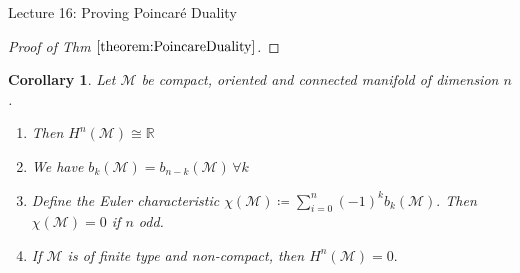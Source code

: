 \documentclass[10pt]{article}
\theoremstyle{plain}
\newtheorem{corollary}[thm]{Corollary}
\theoremstyle{definition}
\newcommand{\Real}{\mathbb{R}}
\newcommand{\man}{\mathcal{M}}
\newcommand{\sumfromto}[2]{\sum\limits_{#1}^{#2}}
\newcommand{\cohomman}[1]{H^{#1}(\man)}
\begin{document}
\begin{section}{Lecture 16: Proving Poincar\'e Duality}
\begin{proof}[Proof of Thm $\ref{theorem:PoincareDuality}$]
\end{proof}
\begin{corollary}
Let $\man$ be compact, oriented and connected manifold of dimension $n$.
\begin{enumerate}
    \item Then $\cohomman{n} \cong \Real$
    \item We have $b_k(\man) = b_{n-k}(\man) \, \forall k$
    \item Define the Euler characteristic $\chi(\man) \coloneqq \sumfromto{i=0}{n} (-1)^k b_k(\man).$ Then $\chi(\man) = 0$ if $n$ odd.
    \item If $\man$ is of finite type and non-compact, then $\cohomman{n} = 0.$
\end{enumerate}
\end{corollary}
\end{section}
\end{document}
